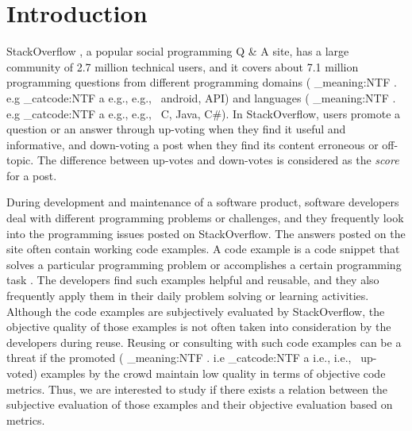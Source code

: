 \documentclass[conference]{IEEEtran}
\makeatletter
\newcommand\latinabbrev[1]{
  \peek_meaning:NTF . {%
    #1\@}%
  { \peek_catcode:NTF a {%
      #1., \@ }%
    {#1., \@}}}
\def\eg{\latinabbrev{e.g}}
\def\ie{\latinabbrev{i.e}}
\makeatother
\begin{document}
\IEEEpeerreviewmaketitle



\section{Introduction}
StackOverflow \cite{sowiki}, a popular social programming Q \& A site,  has a large community of 2.7 million technical users, and it covers about 7.1 million programming questions from different programming domains (\eg\ android, API) and languages (\eg\ C, Java, C\#). In StackOverflow, users promote a question or an answer through up-voting when they find it useful and informative, and down-voting a post when they find its content erroneous or off-topic. The difference between up-votes and down-votes is considered as the \emph{score} for a post. 

During development and maintenance of a software product, software developers deal with different programming problems or challenges, and they frequently look into the programming issues posted on StackOverflow. The answers posted on the site often contain working code examples. A code example is a code snippet that solves a particular programming problem or accomplishes a certain programming task \cite{nasehi}. The developers find such examples helpful and reusable, and they also frequently apply them in their daily problem solving or learning activities. 
Although the code examples are subjectively evaluated by StackOverflow,
the objective quality of those examples is not often taken into consideration by the developers during reuse. Reusing or consulting with such code examples can be a threat if the promoted (\ie\ up-voted) examples by the crowd maintain low quality in terms of objective code metrics.
Thus, we are interested to study if there exists a relation between the subjective evaluation of those examples and their objective evaluation based on metrics.
\end{document}
